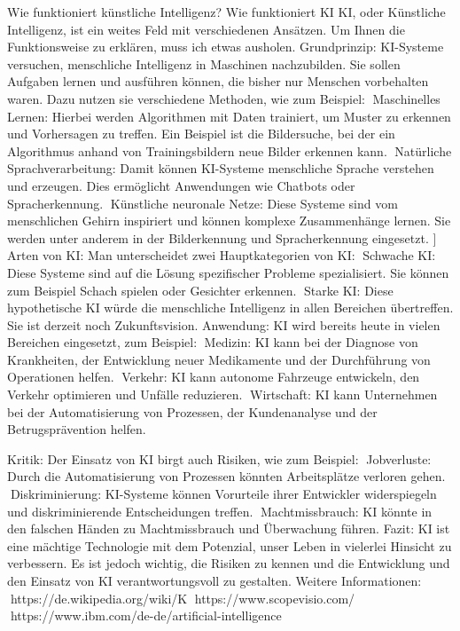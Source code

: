 Wie funktioniert künstliche Intelligenz?
Wie funktioniert KI
KI, oder Künstliche Intelligenz, ist ein weites Feld mit verschiedenen Ansätzen. Um Ihnen die Funktionsweise zu erklären, muss ich etwas ausholen.
Grundprinzip:
KI-Systeme versuchen, menschliche Intelligenz in Maschinen nachzubilden. Sie sollen Aufgaben lernen und ausführen können, die bisher nur Menschen vorbehalten waren. Dazu nutzen sie verschiedene Methoden, wie zum Beispiel:
Maschinelles Lernen: Hierbei werden Algorithmen mit Daten trainiert, um Muster zu erkennen und Vorhersagen zu treffen. Ein Beispiel ist die Bildersuche, bei der ein Algorithmus anhand von Trainingsbildern neue Bilder erkennen kann.
Natürliche Sprachverarbeitung: Damit können KI-Systeme menschliche Sprache verstehen und erzeugen. Dies ermöglicht Anwendungen wie Chatbots oder Spracherkennung.
Künstliche neuronale Netze: Diese Systeme sind vom menschlichen Gehirn inspiriert und können komplexe Zusammenhänge lernen. Sie werden unter anderem in der Bilderkennung und Spracherkennung eingesetzt.
]
Arten von KI:
Man unterscheidet zwei Hauptkategorien von KI:
Schwache KI: Diese Systeme sind auf die Lösung spezifischer Probleme spezialisiert. Sie können zum Beispiel Schach spielen oder Gesichter erkennen.
Starke KI: Diese hypothetische KI würde die menschliche Intelligenz in allen Bereichen übertreffen. Sie ist derzeit noch Zukunftsvision.
Anwendung:
KI wird bereits heute in vielen Bereichen eingesetzt, zum Beispiel:
Medizin: KI kann bei der Diagnose von Krankheiten, der Entwicklung neuer Medikamente und der Durchführung von Operationen helfen.
Verkehr: KI kann autonome Fahrzeuge entwickeln, den Verkehr optimieren und Unfälle reduzieren.
Wirtschaft: KI kann Unternehmen bei der Automatisierung von Prozessen, der Kundenanalyse und der Betrugsprävention helfen.


Kritik:
Der Einsatz von KI birgt auch Risiken, wie zum Beispiel:
Jobverluste: Durch die Automatisierung von Prozessen könnten Arbeitsplätze verloren gehen.
Diskriminierung: KI-Systeme können Vorurteile ihrer Entwickler widerspiegeln und diskriminierende Entscheidungen treffen.
Machtmissbrauch: KI könnte in den falschen Händen zu Machtmissbrauch und Überwachung führen.
Fazit:
KI ist eine mächtige Technologie mit dem Potenzial, unser Leben in vielerlei Hinsicht zu verbessern. Es ist jedoch wichtig, die Risiken zu kennen und die Entwicklung und den Einsatz von KI verantwortungsvoll zu gestalten.
Weitere Informationen:
https://de.wikipedia.org/wiki/K%
https://www.scopevisio.com/
https://www.ibm.com/de-de/artificial-intelligence

